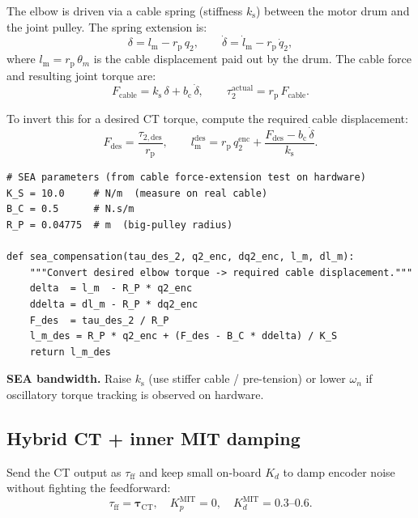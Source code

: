 \documentclass[11pt,a4paper]{article}
\newcommand{\vtau}{\bm{\tau}}
\newcommand{\rp}{r_{\mathrm{p}}}
\newcommand{\ks}{k_{\mathrm{s}}}
\newcommand{\bc}{b_{\mathrm{c}}}
\newcommand{\lm}{l_{\mathrm{m}}}
\newcommand{\lmd}{\dot{l}_{\mathrm{m}}}
\begin{document}
The elbow is driven via a cable spring (stiffness $\ks$) between the motor
drum and the joint pulley.  The spring extension is:
\begin{equation}
  \delta = \lm - \rp\,q_2, \qquad
  \dot{\delta} = \lmd - \rp\,\dot{q}_2,
  \label{eq:delta}
\end{equation}
where $\lm{=}\rp\,\theta_m$ is the cable displacement paid out by the
drum.  The cable force and resulting joint torque are:
\begin{equation}
  F_{\mathrm{cable}} = \ks\,\delta + \bc\,\dot{\delta},\qquad
  \tau_2^{\mathrm{actual}} = \rp\,F_{\mathrm{cable}}.
  \label{eq:sea_tau}
\end{equation}

To invert this for a desired CT torque, compute the required cable displacement:
\begin{equation}
  F_{\mathrm{des}} = \frac{\tau_{2,\mathrm{des}}}{\rp}, \qquad
  \lm^{\mathrm{des}} = \rp\,q_2^{\mathrm{enc}}
                      + \frac{F_{\mathrm{des}} - \bc\,\dot{\delta}}{\ks}.
  \label{eq:sea_inv}
\end{equation}

\begin{lstlisting}[caption={SEA cable compensation for the elbow (Phase~2).}]
# SEA parameters (from cable force-extension test on hardware)
K_S = 10.0     # N/m  (measure on real cable)
B_C = 0.5      # N.s/m
R_P = 0.04775  # m  (big-pulley radius)

def sea_compensation(tau_des_2, q2_enc, dq2_enc, l_m, dl_m):
    """Convert desired elbow torque -> required cable displacement."""
    delta  = l_m  - R_P * q2_enc
    ddelta = dl_m - R_P * dq2_enc
    F_des  = tau_des_2 / R_P
    l_m_des = R_P * q2_enc + (F_des - B_C * ddelta) / K_S
    return l_m_des
\end{lstlisting}

\begin{warnbox}
\textbf{SEA bandwidth.}
Raise $\ks$ (use stiffer cable / pre-tension) or lower $\omega_n$ if
oscillatory torque tracking is observed on hardware.
\end{warnbox}

\subsection{Hybrid CT + inner MIT damping}

Send the CT output as $\tau_{\mathrm{ff}}$ and keep small on-board $K_d$
to damp encoder noise without fighting the feedforward:
\begin{equation}
  \tau_{\mathrm{ff}} = \vtau_{\mathrm{CT}},\quad
  K_p^{\mathrm{MIT}}{=}0,\quad K_d^{\mathrm{MIT}}{=}0.3\text{--}0.6.
  \label{eq:hybrid}
\end{equation}
\end{document}
